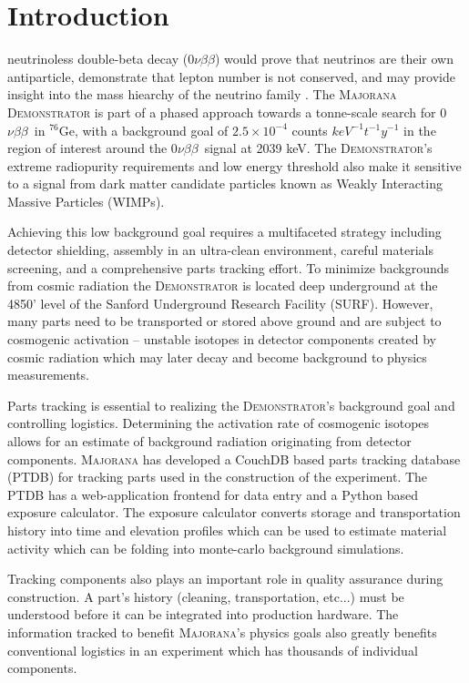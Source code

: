 \documentclass[journal]{IEEEtran}
\def\znbb{0$\nu\beta\beta$}
\def\ge76{$^{76}$Ge}
\begin{document}
\section{Introduction}
 neutrinoless double-beta decay (\znbb) would prove that neutrinos are their own antiparticle,
demonstrate that lepton number is not conserved, and may provide insight into
the mass hiearchy of the neutrino family \cite{phillips_mj} \cite{mj_wilkerson} \cite{avignone_neutrinos}.
The \textsc{Majorana Demonstrator} is part of a phased approach towards a tonne-scale search for \znbb\ in \ge76, with
a background goal of $2.5\times10^{-4}$ counts $keV^{-1} t^{-1} y^{-1}$ \cite{mj_wilkerson} in the region of interest
around the \znbb\ signal at 2039 keV.
The \textsc{Demonstrator}'s extreme radiopurity requirements and low energy threshold also make it sensitive to a signal from dark
matter candidate particles known as Weakly Interacting Massive Particles (WIMPs).

Achieving this low background goal requires a multifaceted strategy including detector shielding, assembly in an ultra-clean environment,
careful materials screening, and a comprehensive parts tracking effort.
To minimize backgrounds from cosmic radiation the \textsc{Demonstrator} is located deep underground
at the 4850' level of the Sanford Underground Research Facility (SURF).
However, many parts need to be transported or stored above ground and are subject to
cosmogenic activation -- unstable isotopes in detector components created by cosmic radiation which may later decay and become background
to physics measurements.

Parts tracking is essential to realizing the \textsc{Demonstrator}'s background goal and controlling logistics.
Determining the activation rate of cosmogenic isotopes allows for an estimate of background
radiation originating from detector components. \textsc{Majorana} has developed a CouchDB  \cite{couchdb_guide} based 
parts tracking database (PTDB)
for tracking parts used in the construction of the experiment. The PTDB has a web-application frontend
for data entry and a Python based exposure calculator. The exposure calculator converts storage and transportation history 
into time and elevation profiles which can be used to estimate
material activity which can be folding into monte-carlo background simulations.

Tracking components also plays an important role in quality assurance during 
construction. A part's history (cleaning, transportation, etc...) must be 
understood before it can be integrated into production hardware. The information tracked
to benefit \textsc{Majorana}'s physics goals also greatly benefits conventional logistics in an
experiment which has thousands of individual components.
\end{document}
